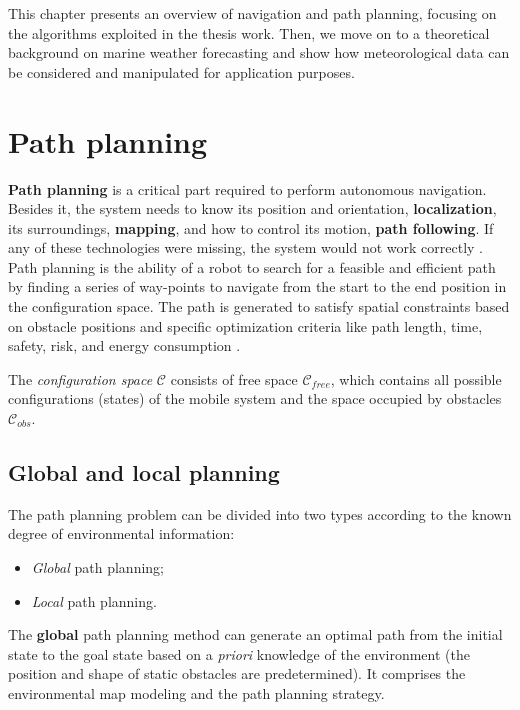 \label{second}
This chapter presents an overview of navigation and path planning, focusing on the algorithms exploited in the thesis work.  Then, we move on to a theoretical background on marine weather forecasting and show how meteorological data can be considered and manipulated for application purposes.
    
\section{Path planning}
\textbf{Path planning} is a critical part required to perform autonomous navigation. Besides it, the system needs to know its position and orientation, \textbf{localization}, its surroundings, \textbf{mapping}, and how to control its motion, \textbf{path following}. If any of these technologies were missing, the system would not work correctly \cite{sakai2018pythonrobotics}.\\
Path planning is the ability of a robot to search for a feasible and efficient path by finding a series of way-points to navigate from the start to the end position in the configuration space. The path is generated to satisfy spatial constraints based on obstacle positions and specific optimization criteria like path length, time, safety, risk, and energy consumption \cite{vagale2021path}.

The \textit{configuration space} $\mathcal{C}$ consists of free space $\mathcal{C}_{free}$, which contains all possible configurations (states) of the mobile system and the space occupied by obstacles $\mathcal{C}_{obs}$.
\subsection{Global and local planning}
The path planning problem can be divided into two types according to the known degree of environmental information:
\begin{itemize}[itemsep=0pt]
	\item \textit{Global} path planning;
	\item \textit{Local} path planning.
\end{itemize}
The \textbf{global} path planning method can generate an optimal path from the initial state to the goal state based on a \textit{priori} knowledge of the environment (the position and shape of static obstacles are predetermined). It comprises the environmental map modeling and the path planning strategy.

